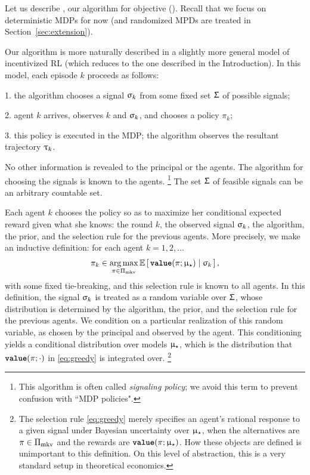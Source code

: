 
Let us describe \mdphh, our algorithm for \traversal objective (). 
Recall that we focus on deterministic MDPs for now (and randomized MPDs are treated in Section~\ref{sec:extension}).


 Our algorithm is more naturally described in a slightly more general model of incentivized RL (which reduces to the one described in the Introduction). In this model, each episode $k$ proceeds as follows:
\begin{OneLiners}
\item[1.] the algorithm chooses a signal $\upsigma_k$ from some fixed set $\Upsigma$ of possible signals;
\item[2.] agent $k$ arrives, observes $k$ and $\upsigma_k$, and chooses a policy $\pi_k$;
\item[3.] this policy is executed in the MDP;
the algorithm observes the resultant trajectory ${\uptau}_k$.
\end{OneLiners}
No other information is revealed to the principal or the agents. The algorithm for choosing the signals is known to the agents.%
\footnote{This algorithm is often called \emph{signaling policy}; we avoid this term to prevent confusion with ``MDP policies".}
The set $\Upsigma$ of feasible signals can be an arbitrary countable set.

Each agent $k$ chooses the policy so as to maximize her conditional expected reward given what she knows: the round $k$, the observed signal $\upsigma_k$, the algorithm, the prior, and the selection rule for the previous agents. More precisely, we make an inductive definition: for each agent $k=1,2, \ldots$
\begin{align}\label{eq:greedy}
\pi_k \in \operatorname*{arg\,max}_{\pi \in \Pi_{\mathrm{mkv}}}
    \mathbb{E}\left[\, {\normalfont \texttt{\textbf{value}}}(\pi;\upmu_{\star}) \mid \upsigma_k\,\right],
\end{align}
with some fixed tie-breaking, and this selection rule is known to all agents. In this definition, the signal $\upsigma_k$ is treated as a random variable over $\Upsigma$, whose distribution is determined by the algorithm, the prior, and the selection rule for the previous agents. We condition on a particular realization of this random variable, as chosen by the principal and observed by the agent. This conditioning yields a conditional distribution over models $\upmu_{\star}$, which is the distribution that ${\normalfont \texttt{\textbf{value}}}(\pi;\cdot)$ in \eqref{eq:greedy} is integrated over.
\footnote{The selection rule \eqref{eq:greedy} merely specifies an agent's rational response to a given signal under Bayesian uncertainty over $\upmu_{\star}$, when the alternatives are $\pi\in\Pi_{\mathrm{mkv}}$ and the rewards are ${\normalfont \texttt{\textbf{value}}}(\pi;\upmu_{\star})$. How these objects are defined is unimportant to this definition. On this level of abstraction, this is a very standard setup in theoretical economics.}

